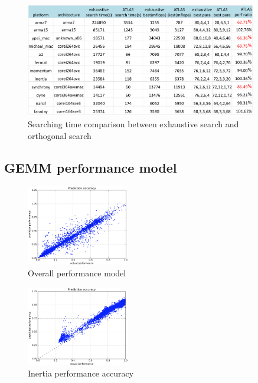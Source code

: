   \begin{figure}[tbhp]
    \centering
    \includegraphics[width=0.9\textwidth]{images/exhaustiveVsorthogonal.png}
    \caption{Searching time comparison between exhaustive search and \atl orthogonal search}
    \label{fig:exhaustiveVsorthogonal}
  \end{figure}

  \subsection{GEMM performance model}
  \label{sec:GEMMperf}
  \begin{figure}[tbhp]
    \centering
    \includegraphics[width=0.4\textwidth]{images/overall_model.png}
    \caption{Overall performance model}
    \label{fig:overall_model}
  \end{figure}

  \begin{figure}[tbhp]
    \centering
    \includegraphics[width=0.4\textwidth]{images/inertia_perf.png}
    \caption{Inertia performance accuracy}
    \label{fig:inertia_perf}
  \end{figure}

